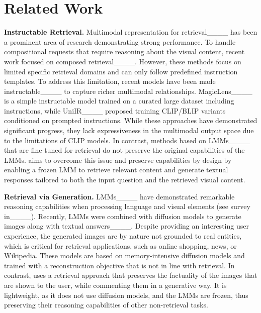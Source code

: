 \section{Related Work}
\label{sec:related_work}

\noindent\textbf{Instructable Retrieval.}
%
Multimodal representation for retrieval____ has been a prominent area of research demonstrating strong performance. %
%
To handle compositional requests that require reasoning about the visual content, recent work focused on composed retrieval____.
However, these methods focus on limited specific retrieval domains and can only follow predefined instruction templates.
%
To address this limitation, recent models have been made instructable____ to capture richer multimodal relationships. 
MagicLens____ is a simple instructable model trained on a curated large dataset including instructions, while UniIR____ proposed training CLIP/BLIP variants conditioned on prompted instructions.
%
While these approaches have demonstrated significant progress, they lack expressiveness in the multimodal output space due to the limitations of CLIP models. 
In contrast, methods based on LMMs____ that are fine-tuned for retrieval do not preserve the original capabilities of the LMMs.
%
%
\modelname aims to overcome this issue and preserve capabilities by design by enabling a frozen LMM to retrieve relevant content and generate textual responses tailored to both the input question and the retrieved visual content.
%
%


\noindent\textbf{Retrieval via Generation.}
LMMs____ have demonstrated remarkable reasoning capabilities when processing language and visual elements (see survey in____).
%
Recently, LMMs were combined with diffusion models to generate images along with textual answers____.
%
%
Despite providing an interesting user experience, the generated images are by nature not grounded to real entities, which is critical for retrieval applications, such as online shopping, news, or Wikipedia.
%
%
These models are based on memory-intensive diffusion models and trained with a reconstruction objective that is not in line with retrieval.
%
%
In contrast, \modelname uses a retrieval approach that preserves the factuality of the images that are shown to the user, while commenting them in a generative way. 
It is lightweight, as it does not use diffusion models, and the LMMs are frozen, thus preserving their reasoning capabilities of other non-retrieval tasks.


